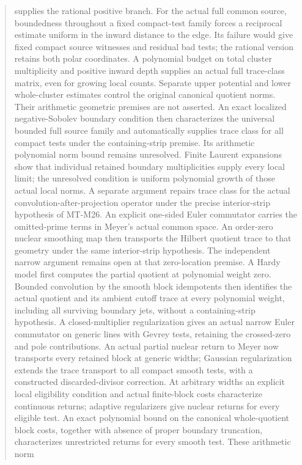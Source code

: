 \documentclass[11pt,a4paper]{article}
\begin{document}
\begin{abstract}
supplies the rational positive branch.
For the actual full common source, boundedness throughout a fixed
compact-test family forces a reciprocal estimate uniform in the
inward distance to the edge. Its failure would give fixed compact
source witnesses and residual bad tests; the rational version
retains both polar coordinates. A polynomial budget on total
cluster multiplicity and positive inward depth supplies an actual
full trace-class matrix, even for growing local counts. Separate
upper potential and lower whole-cluster estimates control the
original canonical quotient norms. Their arithmetic geometric
premises are not asserted. An exact localized negative-Sobolev
boundary condition then characterizes the universal bounded full
source family and automatically supplies trace class for all
compact tests under the containing-strip premise. Its arithmetic
polynomial norm bound remains unresolved.
Finite Laurent expansions show that individual retained boundary
multiplicities supply every local limit; the unresolved condition
is uniform polynomial growth of those actual local norms.
A separate argument repairs trace class for
the actual convolution-after-projection operator under the precise
interior-strip hypothesis of MT-M26. An explicit one-sided Euler
commutator carries the omitted-prime terms in Meyer's actual common
space. An order-zero nuclear smoothing map then transports the
Hilbert quotient trace to that geometry under the same interior-strip
hypothesis. The independent narrow argument remains open at that
zero-location premise. A Hardy model first computes the partial
quotient at polynomial weight zero. Bounded convolution by the
smooth block idempotents then identifies the actual quotient and
its ambient cutoff trace at every polynomial weight, including all
surviving boundary jets, without a containing-strip hypothesis.
A closed-multiplier regularization gives an actual narrow
Euler commutator on generic lines with Gevrey tests, retaining
the crossed-zero and pole contributions. An actual partial nuclear
return to Meyer now transports every retained block at generic
widths; Gaussian regularization extends the trace transport to
all compact smooth tests, with a constructed discarded-divisor
correction. At arbitrary widths an explicit local eligibility condition
and actual finite-block costs characterize continuous returns; adaptive
regularizers give nuclear returns for every eligible test. An exact
polynomial bound on the canonical whole-quotient block costs,
together with absence of proper boundary truncation, characterizes
unrestricted returns for every smooth test. These arithmetic norm

\end{abstract}
\end{document}
